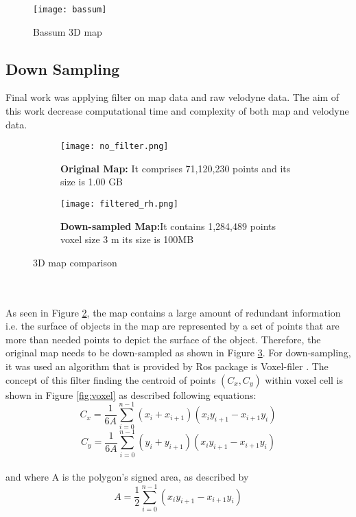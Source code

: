 \begin{figure}[h!]
    \centering
    \texttt{[image: bassum]}
    \captionsetup{singlelinecheck=false}
    \caption{Bassum 3D map}%
    \label{fig:bassum}
\end{figure}

\subsection*{Down Sampling}
Final work was applying filter on map data and raw velodyne data. The aim of this work decrease computational time and complexity of both map and velodyne data.
\\
\begin{figure}[h!]
    \begin{subfigure}{.5\textheight}
        \texttt{[image: no\_filter.png]}
        \caption{\textbf{Original Map:} It comprises 71,120,230 points and its size is 1.00 GB }
        \label{fig:no_filter}
    \end{subfigure}
    \begin{subfigure}{.5\textheight}
        \texttt{[image: filtered\_rh.png]}
        \caption{\textbf{Down-sampled Map:}It contains 1,284,489 points voxel size 3 m its size is 100MB}
        \label{fig:filter_rh}
    \end{subfigure}
    \label{fig:filter}
    \caption{3D map comparison}
\end{figure}
\\
\\
As seen in Figure \ref{fig:no_filter}, the map contains a large amount of redundant information i.e. the surface of objects in the map are represented by a set of points that are more than needed points to depict the surface of the object. Therefore, the original map needs to be down-sampled as shown in Figure \ref{fig:filter_rh}. For down-sampling, it was used an algorithm that is provided by Ros package is Voxel-filer%
. The concept of this filter finding the centroid of points $(C_{x}, C_{y})$ within voxel cell is shown in Figure \ref{fig:voxel} as described following equations:
\begin{equation}
C_{x} =\dfrac{1}{6A}\sum_{i=0}^{n-1}(x_{i}+x_{i+1})(x_{i}y_{i+1}-x_{i+1}y_{i})
\end{equation}
\begin{equation}
C_{y} =\dfrac{1}{6A}\sum_{i=0}^{n-1}(y_{i}+y_{i+1})(x_{i}y_{i+1}-x_{i+1}y_{i})
\end{equation}\\
and where A is the polygon's signed area,\cite{centroid} as described by
\begin{equation}
A =\dfrac{1}{2}\sum_{i=0}^{n-1}(x_{i}y_{i+1}-x_{i+1}y_{i})
\end{equation}

